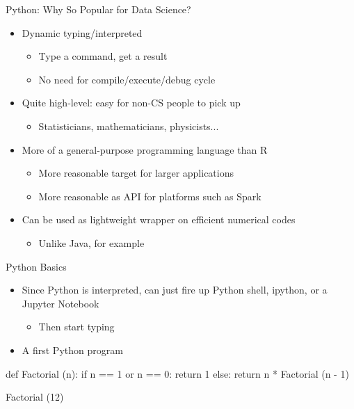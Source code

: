 \documentclass[aspectratio=169]{beamer}
\begin{document}
\begin{frame}{Python: Why So Popular for Data Science?}

\begin{itemize}
\item Dynamic typing/interpreted
	\begin{itemize}
\item 	Type a command, get a result
\item 	No need for compile/execute/debug cycle
	\end{itemize}
\item Quite high-level: easy for non-CS people to pick up
	\begin{itemize}
\item 	Statisticians, mathematicians, physicists...
	\end{itemize}
\item More of a general-purpose programming language than R
	\begin{itemize}
\item 	More reasonable target for larger applications
\item 	More reasonable as API for platforms such as Spark
	\end{itemize}
\item Can be used as lightweight wrapper on efficient numerical codes
	\begin{itemize}
\item 	Unlike Java, for example
	\end{itemize}
\end{itemize}
\end{frame}

\begin{frame}[fragile]{Python Basics}

\begin{itemize}
\item Since Python is interpreted, can just fire up Python shell, ipython, or a Jupyter Notebook
	\begin{itemize}
	\item Then start typing
	\end{itemize}
\item A first Python program
\end{itemize}
\begin{SQL}
def Factorial (n):
     if n == 1 or n == 0:
          return 1
     else:
          return n * Factorial (n - 1)

Factorial (12)
\end{SQL}
\end{frame}
\end{document}
